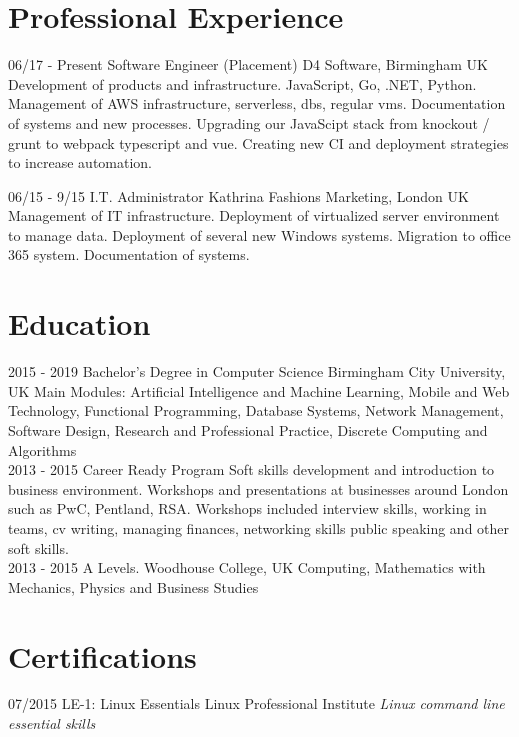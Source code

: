 \documentclass[]{friggeri-cv}
\begin{document}
\section{Professional Experience}
\begin{entrylist}
  \entry
    {06/17 - Present}
    {Software Engineer (Placement) }
    {D4 Software, Birmingham UK}
    {Development of products and infrastructure.
JavaScript, Go, .NET, Python.
Management of AWS infrastructure, serverless, dbs, regular vms.
Documentation of systems and new processes. Upgrading our
JavaScipt stack from knockout / grunt to webpack typescript and vue. Creating new CI and deployment strategies to increase automation.\\}

  \entry
    {06/15 - 9/15}
    {I.T. Administrator}
    {Kathrina Fashions Marketing, London UK}
    {Management of IT infrastructure.
Deployment of virtualized server environment to manage data.
Deployment of several new Windows systems.
Migration to office 365 system.
Documentation of systems.\\}

\end{entrylist}

\section{Education}
\begin{entrylist}
  \entry
    {2015 - 2019}
    {Bachelor's Degree in Computer Science}
    {Birmingham City University, UK}
    {Main Modules: Artificial Intelligence and Machine Learning, Mobile and Web Technology, Functional Programming, Database Systems, Network Management, Software Design, Research and Professional Practice, Discrete Computing and Algorithms\\}
  \entry
    {2013 - 2015}
    {Career Ready Program}
    {}
    {Soft skills development and introduction to business environment.
Workshops and presentations at businesses around London such as PwC, Pentland, RSA.
Workshops included interview skills, working in teams, cv writing, managing finances, networking skills public speaking and other soft skills.\\}
  \entry
    {2013 - 2015}
    {A Levels.}
    {Woodhouse College, UK}
    {Computing, Mathematics with Mechanics, Physics and Business Studies}
\end{entrylist}

\section{Certifications}
\begin{entrylist}
  \entry
    {07/2015}
    {LE-1: Linux Essentials}
    {Linux Professional Institute}
    {\emph{Linux command line essential skills}}
\end{entrylist}
\end{document}
